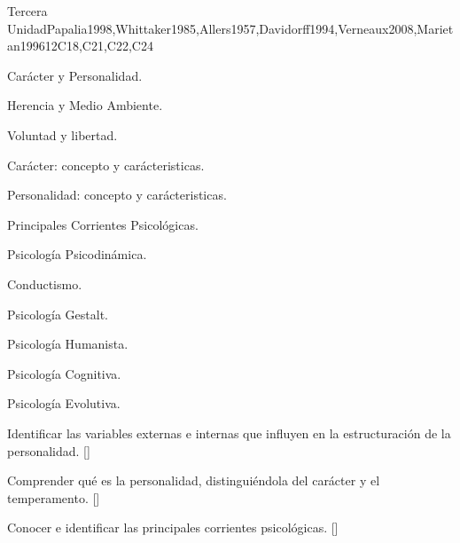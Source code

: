 \begin{syllabus}
\begin{unit}{}{Tercera Unidad}{Papalia1998,Whittaker1985,Allers1957,Davidorff1994,Verneaux2008,Marietan1996}{12}{C18,C21,C22,C24}
\begin{topics}
  \item Carácter y Personalidad.
    \begin{subtopics}
	\item Herencia y Medio Ambiente.
	\item Voluntad y libertad.
	\item Carácter: concepto y carácteristicas.
	\item Personalidad: concepto y carácteristicas.
    \end{subtopics}
  \item Principales Corrientes Psicológicas.
    \begin{subtopics}
	\item Psicología Psicodinámica.
	\item Conductismo.
	\item Psicología Gestalt.
	\item Psicología Humanista.
	\item Psicología Cognitiva.
	\item Psicología Evolutiva.
    \end{subtopics}
\end{topics}
\begin{learningoutcomes}
	\item Identificar las variables externas e internas que influyen en la estructuración de la personalidad. [\Familiarity]
	\item Comprender qué es la personalidad, distinguiéndola del carácter y el temperamento. [\Familiarity]
	\item Conocer e identificar las principales corrientes psicológicas. [\Familiarity]
\end{learningoutcomes}
\end{unit}



\begin{coursebibliography}
\end{coursebibliography}

\end{syllabus}
